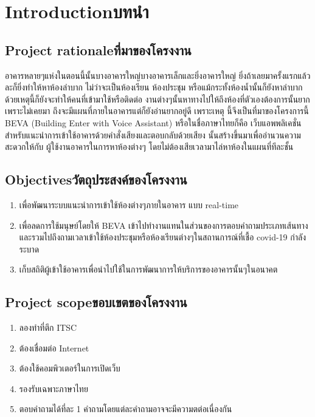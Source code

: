 \chapter{\ifenglish Introduction\else บทนำ\fi}

\section{\ifenglish Project rationale\else ที่มาของโครงงาน\fi}
อาคารหลายๆแห่งในตอนนี้นั้นบางอาคารใหญ่บางอาคารเล็กและยิ่งอาคารใหญ่ ยิ่งถ้าเลยมาครั้งแรกแล้วละก็ยิ่งทำให้หาห้องลำบาก
ไม่ว่าจะเป็นห้องเรียน ห้องประชุม หรือแม้กระทั้งห้องน้ำนั้นก็ยังหาลำบาก ด้วยเหตุนี้ก็ยังจะทำให้คนที่เข้ามาใช้หรือติดต่อ
งานต่างๆนั้นหาทางไปให้ถึงห้องที่ตัวเองต้องการนั้นยากเพราะไม่เคยมา ถึงจะมีแผนที่ภายในอาคารแต่ก็ยังอ่านยากอยู่ดี เพราะเหตุ
นี้จีงเป็นที่มาของโครงการนี้ BEVA (Building Enter with Voice Assistant) หรือในชื่อภาษาไทยก็คือ
เว็บแอพพลิเคชั่นสำหรับแนะนำการเข้าใช้อาคารด้วยคำสั่งเสียงและตอบกลับด้วยเสียง นั้นสร้างขึ้นมาเพื่ออำนวนความสะดวกให้กับ
ผู้ใช้งานอาคารในการหาห้องต่างๆ โดยไม่ต้องเสียเวลามาไล่หาห้องในแผนที่ทีละชั้น

\section{\ifenglish Objectives\else วัตถุประสงค์ของโครงงาน\fi}
\begin{enumerate}
    \item เพื่อพัฒนาระบบแนะนำการเข้าใช้ห้องต่างๆภายในอาคาร แบบ real-time
    \item เพื่อลดการใช้มนุษย์โดยให้ BEVA เข้าไปทำงานแทนในส่วนของการตอบคำถามประเภทเส้นทาง
    และรวมไปถึงถามเวลาเข้าใช้ห้องประชุมหรือห้องเรียนต่างๆในสถานการณ์ที่เชื้อ covid-19 กำลังระบาด
    \item เก็บสถิติผู้เข้าใช้อาคารเพื่อนำไปใช้ในการพัฒนาการให้บริการของอาคารนั้นๆในอนาคต
\end{enumerate}

\section{\ifenglish Project scope\else ขอบเขตของโครงงาน\fi}
\begin{enumerate}
    \item ลองทำที่ตึก ITSC
    \item ต้องเชื่อมต่อ Internet
    \item ต้องใช้คอมพิวเตอร์ในการเปิดเว็บ
    \item รองรับเฉพาะภาษาไทย
    \item ตอบคำถามได้ที่ละ 1 คำถามโดยแต่ละคำถามอาจจะมีความตต่อเนื่องกัน
\end{enumerate}

